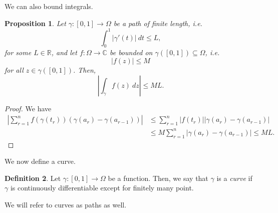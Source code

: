 \documentclass[a4paper, openany]{memoir}
\theoremstyle{definition}
\newtheorem{definition}{Definition}[section]
\theoremstyle{plain}
\newtheorem{proposition}[definition]{Proposition}
\begin{document}
We can also bound integrals.
\begin{proposition}
Let $\gamma: [0, 1] \to \Omega$ be a path of finite length, i.e.
\[\int_0^1 |\gamma'(t)| \ dt \leq L,\]
for some $L \in \mathbb{R}$, and let $f: \Omega \to \mathbb{C}$ be bounded on $\gamma([0, 1]) \subseteq \Omega$, i.e.
\[|f(z)| \leq M\]
for all $z \in \gamma([0, 1])$. Then,
\[\left|\int_\gamma f(z) \ dz\right| \leq ML.\]
\end{proposition}
\begin{proof}
We have
\begin{align*}
    \left|\sum_{r=1}^n f(\gamma(t_r)) (\gamma(a_r) - \gamma(a_{r-1}))\right| &\leq \sum_{r=1}^n |f(t_r)| |\gamma(a_r) - \gamma(a_{r-1})| \\
    &\leq M \sum_{r=1}^n |\gamma(a_r) - \gamma(a_{r-1})| \leq ML.
\end{align*}
\end{proof}

We now define a curve.
\begin{definition}
Let $\gamma: [0, 1] \to \Omega$ be a function. Then, we say that $\gamma$ is a \emph{curve} if $\gamma$ is continuously differentiable except for finitely many point.
\end{definition}
\noindent We will refer to curves as paths as well. 
\end{document}
